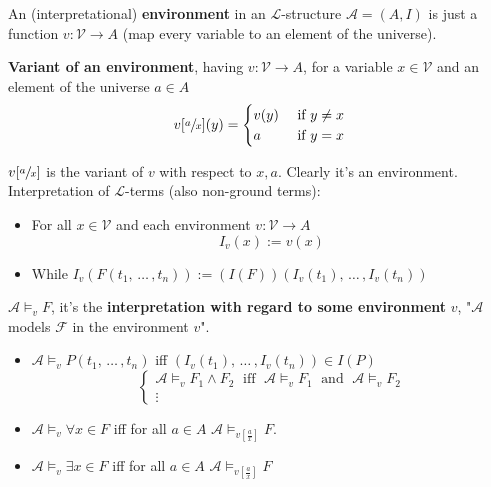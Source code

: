\begin{definition}
	An (interpretational) \textbf{environment} in an $\mathcal{L}$-structure $\mathcal{A} = (A,I)$ is just a function $v: \mathcal{V} \rightarrow A$ (map every variable to an element of the universe).
\end{definition}

\begin{definition}
	\textbf{Variant of an environment}, having $v: \mathcal{V} \rightarrow A$, for a variable $x \in \mathcal{V}$ and an element of the universe $a \in A$
	$$ v[\sfrac{a}{x}] (y) =
	\begin{cases}
		v(y) & \text{ if } y \neq x \\
		a & \text{ if } y = x
	\end{cases}
	$$
\end{definition}
\noindent
$v[\sfrac{a}{x}]$ is the variant of $v$ with respect to $x,a$. Clearly it's an environment.\\

\noindent
Interpretation of $\mathcal{L}$-terms (also non-ground terms):
\begin{itemize}
	\item For all $x \in \mathcal{V}$ and each environment $v: \mathcal{V} \rightarrow A$
	$$ I_v (x) := v(x) $$
	\item While $I_v (F(t_1, \, \dots \, , t_n)) := (I(F))(I_v(t_1), \, \dots \, , I_v (t_n))$
\end{itemize}

\begin{definition} $\mathcal{A} \models_v F$, it's the \textbf{interpretation with regard to some environment} $v$, "$\mathcal{A}$ models $\mathcal{F}$ in the environment $v$".
\begin{itemize}
	\item $\mathcal{A} \models_v P(t_1, \, \dots \, , t_n)$ iff $(I_v (t_1), \, \dots \, , I_v (t_n)) \in I(P)$
	$$
	\begin{cases}
		\mathcal{A} \models_v F_1 \wedge F_2 \; \text{ iff } \; \mathcal{A} \models_v F_1 \; \text{ and } \; \mathcal{A} \models_v F_2 \\
		\vdots
	\end{cases}
	$$
	\item $\mathcal{A} \models_v \forall x \in F$ iff for all $a \in A$ $\mathcal{A} \models_{v [\frac{a}{x}]} F$.\\
	\item $\mathcal{A} \models_v \exists x \in F$ iff for all $a \in A$ $\mathcal{A} \models_{v [\frac{a}{x}]} F$
\end{itemize}
\end{definition}

